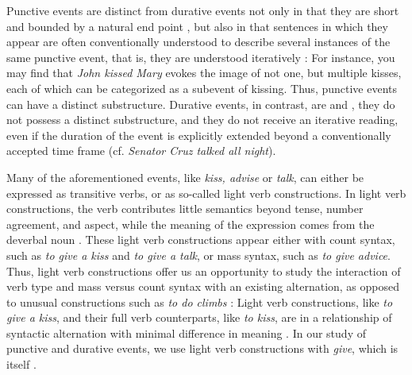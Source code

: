 \documentclass[review,12pt,authoryear]{elsarticle}
\begin{document}

Punctive events are distinct from durative events not only in that they are  short and bounded by a natural end point , but also in that sentences in which they appear are often conventionally understood to describe several instances of the same punctive event, that is, they are understood iteratively \citep{paczynski2014events,barner2008events,Kim2015}: For instance, you may find that \emph{John kissed Mary} evokes the image of not one, but multiple kisses, each of which can be categorized as a subevent of kissing. Thus, punctive events can have a distinct substructure. Durative events, in contrast, are  and , they do not possess a distinct substructure, and they do not receive an iterative reading, even if the duration of the event is explicitly extended beyond a conventionally accepted time frame (cf. \emph{Senator Cruz talked all night}). 

Many of the aforementioned events, like \emph{kiss, advise} or \emph{talk}, can either be expressed as transitive verbs, or as so-called light verb constructions. In light verb constructions, the verb contributes little semantics beyond tense, number agreement, and aspect, while the meaning of the expression comes from the deverbal noun \citep{Jespersen1954,Wiese2006,Jackendoff1974,Brugman2001,Butt2003,butt2010}. These light verb constructions appear either with count syntax, such as \emph{to give a kiss} and \emph{to give a talk}, or mass syntax, such as \emph{to give advice}. Thus, light verb constructions offer us an opportunity to study the interaction of verb type and mass versus count syntax with an existing alternation, as opposed to unusual constructions such as \emph{to do climbs} \citep{barner2008events}: Light verb constructions, like \emph{to give a kiss}, and their full verb counterparts, like \emph{to kiss}, are in a relationship of syntactic alternation with minimal difference in meaning \citep{glatz2006funktionsverbgefuge,Allerton2002}. In our study of punctive and durative events, we use light verb constructions with \emph{give}, which is itself  \citep{newman1996}.
\end{document}
